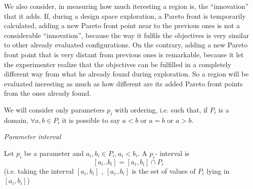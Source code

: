 We also consider, in measuring how much iteresting a region is, the
``innovation'' that it adds. If, during a design space exploration,
a Pareto front is temporarily calculated, adding a new Pareto front
point near to the previous ones is not a considerable ``innovation'',
because the way it fulfils the objectives is very similar to other
already evaluated configurations. On the contrary, adding a new Pareto
front point that is very distant from previous ones is remarkable,
because it let the experimenter realize that the objectives can be
fulfilled in a completely different way from what he already found
during exploration. So a region will be evaluated ineresting as much
as how different are its added Pareto front points from the ones already
found.
\begin{rem}
We will consider only parameters $p_{i}$ with ordering, i.e. such
that, if $P_{i}$ is a domain, $\forall a,b\in P_{i}$ it is possible
to say $a<b$ or $a=b$ or $a>b$.
\end{rem}
\begin{defn}
\emph{Parameter interval}

Let $p_{i}$ be a parameter and $a_{i},b_{i}\in P_{i},a_{i}<b_{i}$.
A $p_{i}$- interval is
\[
\left[a_{i}..b_{i}\right]=\left[a_{i},b_{i}\right]\cap P_{i}
\]
 (i.e. taking the interval $\left[a_{i},b_{i}\right]$ , $\left[a_{i}..b_{i}\right]$
is the set of values of $P_{i}$ lying in $\left[a_{i},b_{i}\right]$)
\end{defn}

